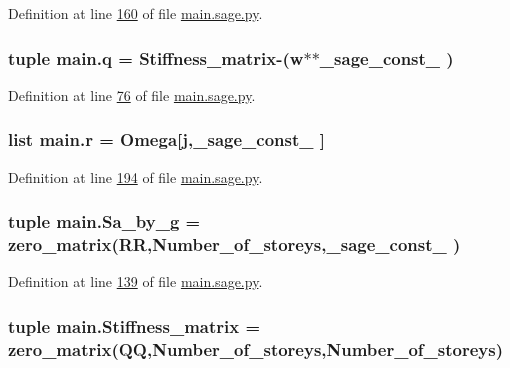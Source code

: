 Definition at line \hyperlink{main_8sage_8py_source_l00160}{160} of file \hyperlink{main_8sage_8py_source}{main.\+sage.\+py}.

\hypertarget{namespacemain_a1787a37505189f764069a45071189112}{}
\subsubsection[{q}]{\setlength{\rightskip}{0pt plus 5cm}tuple main.\+q = {\bf Stiffness\+\_\+matrix}-\/({\bf w}$\ast$$\ast${\bf \+\_\+sage\+\_\+const\+\_} )}\label{namespacemain_a1787a37505189f764069a45071189112}


Definition at line \hyperlink{main_8sage_8py_source_l00076}{76} of file \hyperlink{main_8sage_8py_source}{main.\+sage.\+py}.

\hypertarget{namespacemain_a4760f4121f66000c5570f75176649cb8}{}
\subsubsection[{r}]{\setlength{\rightskip}{0pt plus 5cm}list main.\+r = {\bf Omega}\mbox{[}{\bf j},\+\_\+sage\+\_\+const\+\_ \mbox{]}}\label{namespacemain_a4760f4121f66000c5570f75176649cb8}


Definition at line \hyperlink{main_8sage_8py_source_l00194}{194} of file \hyperlink{main_8sage_8py_source}{main.\+sage.\+py}.

\hypertarget{namespacemain_ac3a509169246622b50fc23d809d30833}{}
\subsubsection[{Sa\+\_\+by\+\_\+g}]{\setlength{\rightskip}{0pt plus 5cm}tuple main.\+Sa\+\_\+by\+\_\+g = zero\+\_\+matrix(R\+R,Number\+\_\+of\+\_\+storeys,\+\_\+sage\+\_\+const\+\_ )}\label{namespacemain_ac3a509169246622b50fc23d809d30833}


Definition at line \hyperlink{main_8sage_8py_source_l00139}{139} of file \hyperlink{main_8sage_8py_source}{main.\+sage.\+py}.

\hypertarget{namespacemain_a0011be18dbc87087d6aaf28802f121c0}{}
\subsubsection[{Stiffness\+\_\+matrix}]{\setlength{\rightskip}{0pt plus 5cm}tuple main.\+Stiffness\+\_\+matrix = zero\+\_\+matrix(Q\+Q,Number\+\_\+of\+\_\+storeys,Number\+\_\+of\+\_\+storeys)}\label{namespacemain_a0011be18dbc87087d6aaf28802f121c0}



